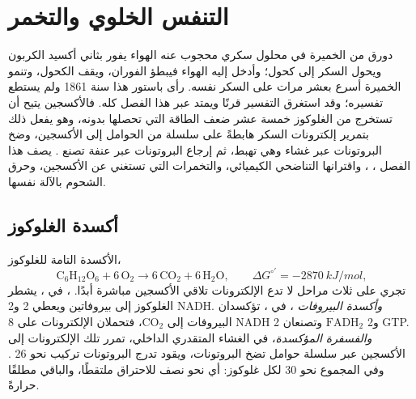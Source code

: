 \chapter{التنفس الخلوي والتخمر}\label{ch:b1:respiration-fermentation}

دورق من الخميرة في محلول سكري محجوب عنه الهواء يفور بثاني أكسيد
الكربون ويحول السكر إلى كحول؛ وأدخل إليه الهواء فيبطؤ الفوران، ويقف
الكحول، وتنمو الخميرة أسرع بعشر مرات على السكر نفسه. رأى باستور هذا
سنة 1861 ولم يستطع تفسيره؛ وقد استغرق التفسير قرنًا ويمتد عبر هذا
الفصل كله. فالأكسجين يتيح  أن تستخرج من الغلوكوز خمسة عشر ضعف
الطاقة التي تحصلها بدونه، وهو يفعل ذلك بتمرير إلكترونات السكر هابطةً
على سلسلة من الحوامل إلى الأكسجين، وضخ البروتونات عبر غشاء وهي تهبط،
ثم إرجاع البروتونات عبر عنفة تصنع . يصف هذا الفصل ،
،  واقترانها التناضحي الكيميائي، والتخمرات
التي تستغني عن الأكسجين، وحرق الشحوم  بالآلة نفسها.

\section{أكسدة الغلوكوز}

\begin{proposition}\label{prop:b1:respiration-fermentation:overview}
الأكسدة التامة للغلوكوز،
\[
\mathrm{C_6H_{12}O_6} + 6\,\mathrm{O_2} \to 6\,\mathrm{CO_2} + 6\,\mathrm{H_2O},
\qquad \Delta G^{\circ\prime} = \qty{-2870}{kJ/mol},
\]
تجري على ثلاث مراحل لا تدع الإلكترونات تلاقي الأكسجين مباشرة أبدًا.
\emph{}، في ، يشطر الغلوكوز إلى بيروفاتين
ويعطي 2  و2 NADH. \emph{وأكسدة البيروفات }، في ، تؤكسدان البيروفات إلى $\mathrm{CO_2}$، فتحملان الإلكترونات
على 8 NADH و2 $\mathrm{FADH_2}$ وتصنعان 2 GTP. \emph{والفسفرة
المؤكسدة}، في الغشاء المتقدري الداخلي، تمرر تلك الإلكترونات إلى
الأكسجين عبر سلسلة حوامل تضخ البروتونات، ويقود تدرج البروتونات تركيب
نحو 26 . وفي المجموع نحو 30  لكل غلوكوز: أي نحو نصف  للاحتراق ملتقطًا، والباقي مطلقًا حرارةً.
\end{proposition}

